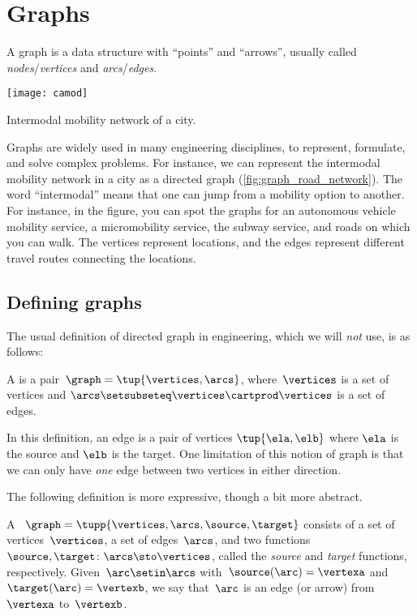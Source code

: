 
\section{Graphs}

A graph is a data structure with ``points'' and ``arrows'', usually called \emph{no\-des}/\emph{ver\-tices} and \emph{arcs}/\emph{edges}.

\begin{marginfigure}
    \texttt{[image: camod]}
    \caption{Intermodal mobility network of a city.}
    \label{fig:graph_road_network}
\end{marginfigure}

Graphs are widely used in many engineering disciplines, to represent, formulate, and solve complex problems.
For instance, we can represent the intermodal mobility network in a city as a directed graph (\cref{fig:graph_road_network}).
The word ``intermodal'' means that one can jump from a mobility option to another.
For instance, in the figure, you can spot the graphs for an autonomous vehicle mobility service, a micromobility service, the subway service, and roads on which you can walk.
The vertices represent locations, and the edges represent different travel routes connecting the locations.

\subsection{Defining graphs}

The usual definition of directed graph in engineering, which we will \emph{not} use, is as follows:

\begin{definition}
    \label{def:directed-graph}
    A  is a pair~$\graph=\tup{\vertices, \arcs}$, where~$\vertices$ is
    a set of vertices and $\arcs \setsubseteq \vertices \cartprod \vertices$ is a set of edges.
\end{definition}
In this definition, an edge is a pair of vertices $\tup{\ela,\elb}$ where $\ela$ is the source and $\elb$ is the target.
One limitation of this notion of graph is that we can only have \emph{one} edge between two vertices in either direction.

The following definition is more expressive, though a bit more abstract.

\begin{definition}
    \label{def:Graph}
    A ~$\graph=\tupp{\vertices,\arcs, \source,\target}$ consists of a set of vertices~$\vertices$, a set of edges~$\arcs$, and two functions~$\source,\target \colon \arcs \sto \vertices$, called the \emph{source} and \emph{target} functions, respectively.
    Given~$\arc\setin \arcs$ with~$\source(\arc)=\vertexa$ and~$\target(\arc)=\vertexb$, we say that~$\arc$ is an edge (or arrow) from~$\vertexa$ to~$\vertexb$.
\end{definition}

